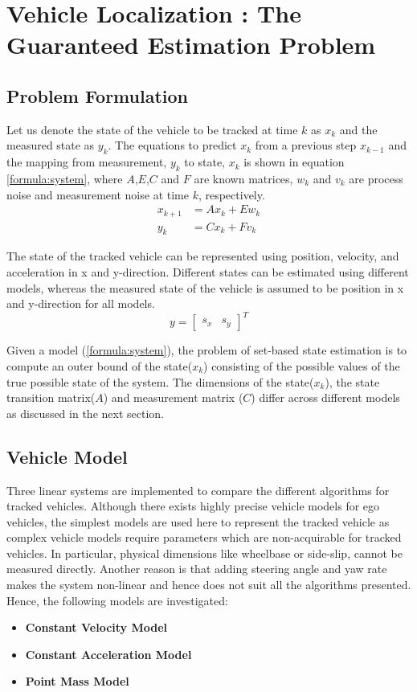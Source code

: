 \chapter{Vehicle Localization : The Guaranteed Estimation Problem} \label{ch:problem}
\section{Problem Formulation}
Let us denote the state of the vehicle to be tracked at time $k$ as $x_k$ and the measured state as $y_k$. The equations to predict $x_k$ from a previous step $x_{k-1}$ and the mapping from measurement, $y_k$ to state, $x_k$ is shown in equation \eqref{formula:system}, where $A$,$E$,$C$ and $F$ are known matrices, $w_k$ and $v_k$ are process noise and measurement noise at time $k$, respectively. 
\begin{equation}
\label{formula:system}
\begin{split}
x_{k+1} &= Ax_k + Ew_k\\
y_k &= Cx_k + Fv_k
\end{split}
\end{equation}

The state of the tracked vehicle can be represented using position, velocity, and acceleration in x and y-direction. Different states can be estimated using different models, whereas the measured state of the vehicle is assumed to be position in x and y-direction for all models.
\begin{equation*}
y =[ 
\begin{matrix}
s_x & s_y
\end{matrix}
]^T
\end{equation*}

Given a model (\eqref{formula:system}), the problem of set-based state estimation is to compute an outer bound of the state($x_k$) consisting of the possible values of the true possible state of the system. The dimensions of the state($x_k$), the state transition matrix($A$) and measurement matrix ($C$) differ across different models as discussed in the next section.
\section{Vehicle Model}
Three linear systems are implemented to compare the different algorithms for tracked vehicles. Although there exists highly precise vehicle models for ego vehicles, the simplest models are used here to represent the tracked vehicle as complex vehicle models require parameters which are non-acquirable for tracked vehicles. In particular, physical dimensions like wheelbase or side-slip, cannot be measured directly. Another reason is that adding steering angle and yaw rate makes the system non-linear and hence does not suit all the algorithms presented. Hence, the following models are investigated:
\begin{itemize}
\item \textbf{Constant Velocity Model}
\item \textbf{Constant Acceleration Model}
\item \textbf{Point Mass Model}
\end{itemize}
